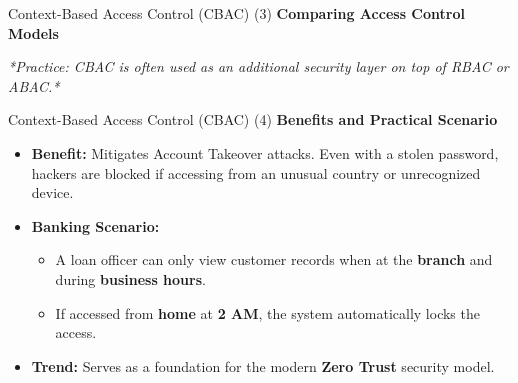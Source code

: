 \begin{frame}{Context-Based Access Control (CBAC) (3)}
    \Large
    \textbf{Comparing Access Control Models}
    \vspace{0.4cm}
    \begin{table}[]
        \centering
    \end{table}
    \vspace{0.3cm}
    \normalsize
    \textit{*Practice: CBAC is often used as an additional security layer on top of RBAC or ABAC.*}
\end{frame}

\begin{frame}{Context-Based Access Control (CBAC) (4)}
    \Large
    \textbf{Benefits and Practical Scenario}
    \vspace{0.3cm}
    \begin{itemize}
        \item \textbf{Benefit:} Mitigates Account Takeover attacks. Even with a stolen password, hackers are blocked if accessing from an unusual country or unrecognized device.
        \item \textbf{Banking Scenario:}
        \begin{itemize}
            \large
            \item A loan officer can only view customer records when at the \textbf{branch} and during \textbf{business hours}.
            \item If accessed from \textbf{home} at \textbf{2 AM}, the system automatically locks the access.
        \end{itemize}
        \item \textbf{Trend:} Serves as a foundation for the modern \textbf{Zero Trust} security model.
    \end{itemize}
\end{frame}

